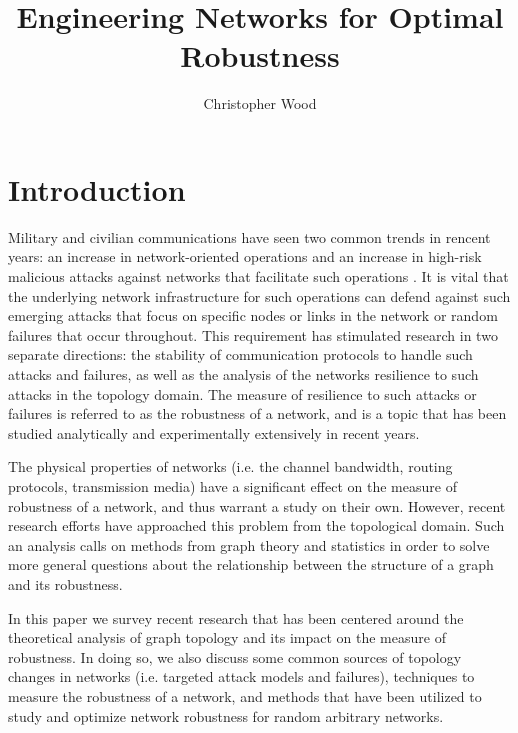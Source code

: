 \documentclass[doc]{apa}%
\title{Engineering Networks for Optimal Robustness}
\author{Christopher Wood}
\affiliation{Department of Computer Science \\ Rochester Institute of Technology}
\begin{document}
\maketitle   

\section{Introduction}

Military and civilian communications have seen two common trends in rencent years: an increase in network-oriented operations and an increase in high-risk malicious attacks against networks that facilitate such operations \cite{Bernardnetworkrobustness}. It is vital that the underlying network infrastructure for such operations can defend against such emerging attacks that focus on specific nodes or links in the network or random failures that occur throughout. This requirement has stimulated research in two separate directions: the stability of communication protocols to handle such attacks and failures, as well as the analysis of the networks resilience to such attacks in the topology domain. The measure of resilience to such attacks or failures is referred to as the robustness of a network, and is a topic that has been studied analytically and experimentally extensively in recent years.

The physical properties of networks (i.e. the channel bandwidth, routing protocols, transmission media) have a significant effect on the measure of robustness of a network, and thus warrant a study on their own. However, recent research efforts have approached this problem from the topological domain. Such an analysis calls on methods from graph theory and statistics in order to solve more general questions about the relationship between the structure of a graph and its robustness. 

In this paper we survey recent research that has been centered around the theoretical analysis of graph topology and its impact on the measure of robustness. In doing so, we also discuss some common sources of topology changes in networks (i.e. targeted attack models and failures), techniques to measure the robustness of a network, and methods that have been utilized to study and optimize network robustness for random arbitrary networks.

\end{document}
